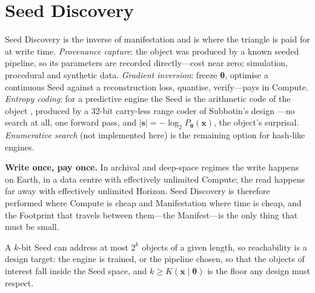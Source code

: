\documentclass[11pt,a4paper]{article}
\theoremstyle{definition}
\theoremstyle{plain}
\theoremstyle{remark}
\newcommand{\KC}{K}
\newcommand{\seed}{\mathbf{s}}
\newcommand{\weights}{\bm{\theta}}
\newcommand{\file}{\mathbf{x}}
\begin{document}
\section{Seed Discovery}
\label{sec:discovery}
Seed Discovery is the inverse of manifestation and is where the triangle is paid for at write
time. \emph{Provenance capture}: the object was produced by a known seeded pipeline, so its
parameters are recorded directly---cost near zero; simulation, procedural and synthetic data.
\emph{Gradient inversion}: freeze $\weights$, optimise a continuous Seed against a
reconstruction loss, quantise, verify---pays in Compute. \emph{Entropy coding}: for a predictive
engine the Seed is the arithmetic code of the object \citep{witten1987}, produced by a 32-bit
carry-less range coder of Subbotin's design \citep{subbotin1999,martin1979}---no search at all,
one forward pass, and $|\seed|=-\log_2P_{\weights}(\file)$, the object's surprisal.
\emph{Enumerative search} (not implemented here) is the remaining option for hash-like engines.
\begin{keyinsight}
\textbf{Write once, pay once.} In archival and deep-space regimes the write happens on Earth, in
a data centre with effectively unlimited Compute; the read happens far away with effectively
unlimited Horizon. Seed Discovery is therefore performed where Compute is cheap and
Manifestation where time is cheap, and the Footprint that travels between them---the
Manifest---is the only thing that must be small.
\end{keyinsight}
\noindent A $k$-bit Seed can address at most $2^{k}$ objects of a given length, so
reachability is a design target: the engine is trained, or the pipeline chosen, so that the
objects of interest fall inside the Seed space, and $k\ge\KC(\file\mid\weights)$ is the floor any
design must respect.

\end{document}
